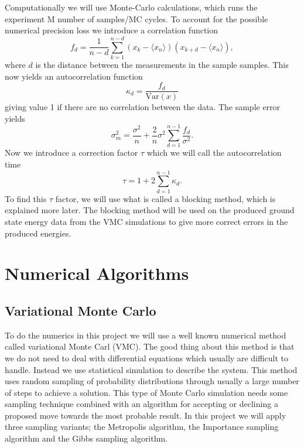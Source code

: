 \documentclass[12pt,a4paper,english]{article}
\begin{document}
Computationally we will use Monte-Carlo calculations, which runs the experiment M number of samples/MC cycles. To account for the possible numerical precision loss we introduce a correlation function 
\begin{equation}
\label{eq:stat_corr_func}
f_d=\frac{1}{n-d}\sum_{k=1}^{n-d}(x_k-\langle x_n\rangle)(x_{k+d}-\langle x_n\rangle),
\end{equation}
where $d$ is the distance between the measurements in the sample samples. This now yields an autocorrelation function
\begin{equation}
\label{eq:stat_autocorr}
\kappa_d=\frac{f_d}{\text{Var}(x)}
\end{equation}
giving value 1 if there are no correlation between the data. The sample error yields
\begin{equation*}
\sigma_m^2=\frac{\sigma^2}{n}+\frac{2}{n}\sigma^2\sum_{d=1}^{n-1}\frac{f_d}{\sigma^2}.
\end{equation*}
Now we introduce a correction factor $\tau$ which we will call the autocorrelation time
\begin{equation}
\label{eq:stat_autocorr_time}
\tau= 1+2\sum_{d=1}^{n-1}\kappa_d.
\end{equation}
To find this $\tau$ factor, we will use what is called a blocking method, which is explained more later. The blocking method will be used on the produced ground state energy data from the VMC simulations to give more correct errors in the produced energies.


\section{Numerical Algorithms}
\label{sect:Num_algos}
\subsection{Variational Monte Carlo}
\label{subsect:VMC}
To do the numerics in this project we will use a well known numerical method called variational Monte Carl (VMC). The good thing about this method is that we do not need to deal with differential equations which usually are difficult to handle. Instead we use statistical simulation to describe the system. This method uses random sampling of probability distributions through usually a large number of steps to achieve a solution. This type of Monte Carlo simulation needs some sampling technique combined with an algorithm for accepting or declining a proposed move towards the most probable result. In this project we will apply three sampling variants; the Metropolis algorithm, the Importance sampling algorithm and the Gibbs sampling algorithm.
\end{document}

